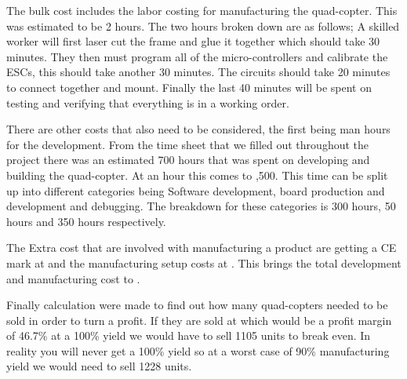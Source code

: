 \documentclass[a4paper,11pt]{article}
\begin{document}
\newline
The bulk cost includes the labor costing for manufacturing the quad-copter. This was estimated to be 2 hours. The two hours broken down are as follows; A skilled worker will first laser cut the frame and glue it together which should take 30 minutes. They then must program all of the micro-controllers and calibrate the ESCs, this should take another 30 minutes. The circuits should take 20 minutes to connect together and mount. Finally the last 40 minutes will be spent on testing and verifying that everything is in a working order.  

There are other costs that also need to be considered, the first being man hours for the development. From the time sheet that we filled out throughout the project there was an estimated 700 hours that was spent on developing and building the quad-copter. At  an hour this comes to ,500. This time can be split up into different categories being Software development, board production and development and debugging. The breakdown for these categories is 300 hours, 50 hours and 350 hours respectively. 

The Extra cost that are involved with manufacturing a product are getting a CE mark at  and the manufacturing setup costs at .
This brings the total development and manufacturing cost to .

Finally calculation were made to find out how many quad-copters needed to be sold in order to turn a profit. If they are sold at  which would be a profit margin of 46.7\% at a 100\% yield we would have to sell 1105 units to break even. In reality you will never get a 100\% yield so at a worst case of 90\% manufacturing yield we would need to sell 1228 units. 
\end{document}

